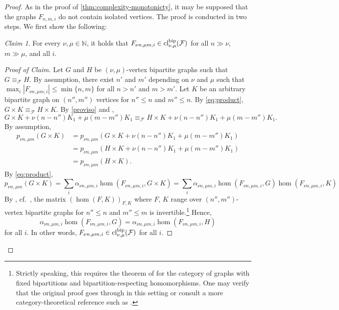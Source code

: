 \documentclass[10pt,a4paper]{article}
\theoremstyle{definition}
\theoremstyle{plain}
\theoremstyle{remark}
\newtheorem{claim}{Claim}[definition]
\newenvironment{claimproof}[1][Proof of Claim]{\begin{proof}[#1] \renewcommand{\qedsymbol}{$\lrcorner$}}{ \end{proof}}
\DeclareMathOperator{\cl}{cl}
\begin{document}
	\begin{proof}
		As in the proof of \cref{thm:complexity-monotonicty},
		it may be supposed that the graphs $F_{n,m,i}$ do not contain isolated vertices.
		The proof is conducted in two steps.
		We first show the following:
		\begin{claim}
			For every $\nu, \mu \in \mathbb{N}$,
			it holds that $F_{\nu n, \mu m, i} \in \cl_{\nu, \mu}^{\textup{bip}}(\mathcal{F})$ for all $n \gg \nu$, $m \gg \mu$, and all $i$.
		\end{claim}
		\begin{claimproof}
			Let $G$ and $H$ be $(\nu, \mu)$-vertex bipartite graphs such that $G \equiv_{\mathcal{F}} H$.
			By assumption,
			there exist $n'$ and $m'$ depending on $\nu$ and $\mu$
			such that  $\max_i |F_{\nu n, \mu  m,i }| \leq \min \{n,m\}$
			for all $n > n'$ and $m > m'$.
			Let $K$ be an arbitrary bipartite graph on $(n'',m'')$ vertices for $n'' \leq n$ and $m'' \leq n$.
			By \cref{eq:product},
			$G \times K \equiv_{\mathcal{F}} H \times K$.
			By \cref{proviso} and \cite[Theorem~7]{seppelt_logical_2024},
			\[ G \times K + \nu(n-n'') K_1 + \mu (m-m'') K_1 \equiv_{\mathcal{F}} H \times K  + \nu(n-n'') K_1 + \mu (m-m'') K_1. \]
			By assumption,
			\begin{align*}
				p_{\nu n, \mu m}(G \times K) 
				&=  p_{\nu n, \mu m}(G \times K + \nu(n-n'') K_1 + \mu (m-m'') K_1 ) \\
				&=  p_{\nu n, \mu m}(H \times K+ \nu(n-n'') K_1 + \mu (m-m'') K_1) \\
				&= p_{\nu n, \mu m}(H \times K).
			\end{align*}
			By \cref{eq:product},
			\[
			p_{\nu n, \mu m}(G \times K) 
			= \sum_i \alpha_{\nu n, \mu m,i} \hom(F_{\nu n, \mu m,i}, G \times K)  
			= \sum_i \alpha_{\nu n, \mu m,i} \hom(F_{\nu n, \mu m,i}, G) \hom(F_{\nu n, \mu m,i}, K) 
			\]
			By \cite{lovasz_operations_1967}, cf.\ \cite[Lemma~6]{seppelt_logical_2024},
			the matrix $(\hom(F, K))_{F, K}$ where $F$, $K$ range over $(n'',m'')$-vertex bipartite graphs for $n'' \leq n$ and $m'' \leq m$ is invertible.\footnote{Strictly speaking, this requires the theorem of \textcite{lovasz_operations_1967} for the category of graphs with fixed bipartitions and bipartition-respecting homomorphisms. One may verify that the original proof goes through in this setting or consult a more category-theoretical reference such as \cite{pultr_isomorphism_1973}.}
			Hence,
			\[
			\alpha_{\nu n, \mu m,i} \hom(F_{\nu n, \mu m,i}, G) = \alpha_{\nu n, \mu m,i} \hom(F_{\nu n, \mu m,i}, H)
			\]
			for all $i$.
			In other words, $F_{\nu n, \mu m,i} \in \cl_{\nu, \mu}^{\textup{bip}}(\mathcal{F})$ for all $i$. 
		\end{claimproof}
		

\end{proof}
\end{document}

